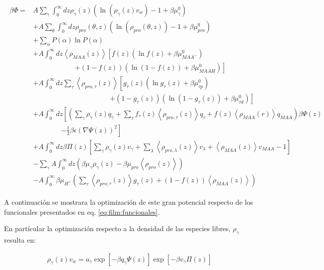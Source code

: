 \begin{align}
	\begin{aligned}
		\beta \Phi=  & A\sum_{\gamma}\int_0^\infty{dz\rho_\gamma(z)\left(\ln \left(\rho_\gamma (z)v_w\right) -1 + \beta\mu^0_\gamma\right)} \\
		&+ A\sum_{\theta}\int_0^\infty{dz\rho_{pro}(\theta,z)\left(\ln \left(\rho_{pro}(\theta,z)\right) -1 + \beta\mu^0_{pro} \right)} \\
		&+ \sum_\alpha{P(\alpha)\ln P(\alpha)} \\
		& + A\int_0^\infty dz \left<\rho_{MAA}(z)\right> \left[f(z)(\ln f(z)+ \beta\mu^0_{MAA^-})\right.\\
		& \qquad\qquad\qquad \left.+(1-f(z))(\ln (1-f(z))+\beta\mu^0_{MAAH})\right] \\
		& + A\int_0^\infty dz \sum_\tau \left<\rho_{pro,\tau}(z)\right> \left[g_\tau(z)(\ln g_\tau(z)+ \beta\mu^0_{\tau p})\right.\\
		&\qquad \qquad \qquad\qquad \qquad\quad \left.+(1-g_\tau(z))(\ln (1-g_\tau(z))+\beta\mu^0_{\tau d})\right]   \\
		& +A\int_0^\infty dz \left[\left(\sum_{\gamma } {\rho_\gamma(z) q_\gamma + \sum_\tau{f_\tau(z) \left<\rho_{pro,\tau}(z)\right> q_\tau} +  f(z) \left<\rho_{MAA}(r)\right>q_{MAA}}\right)\beta\Psi(z) \right. \\ & \qquad \qquad \left.-\frac{1}{2}\beta\epsilon(\nabla\Psi(z))^2 \right] \\ 
		& +A \int_0^\infty dz\beta\Pi(z){\left[\sum_{\gamma}\rho_\gamma(z) v_\gamma + \sum_\lambda{\left<\rho_{pro,\lambda}(z)\right>v_\lambda} + \left<\rho_{MAA}(z)\right>v_{MAA} -1 \right]} \\
		&   -\sum_\gamma A\int_0^\infty dz \left(\beta \mu_\gamma \rho_\gamma(z) - \beta \mu_{pro} \left<\rho_{pro}(z)\right> \right)  \\
		&  -A\int_0^\infty \beta\mu_{H^+} \left( \sum_\tau\left< \rho_{pro,\tau}(z) \right>g_\tau(z) + (1-f(z)) \left< \rho_{MAA}(z) \right> \right )
	\end{aligned}
\end{align}
 

A continuaci\'on se mostrara la optimizaci\'on de este gran potencial respecto de los funcionales presentados en  eq. \ref{eq:film:funcionales}.

En part\'icular la optimizaci\'on respecto a la densidad de las especies libres, $\rho_\gamma$ resulta en:

\begin{align}
	\rho_\gamma(z)v_w = a_\gamma \exp\left[-\beta q_\gamma\Psi(z)\right] \exp\left[-\beta v_\gamma\Pi(z)\right]
	\label{eq:film:free-species}
\end{align}

